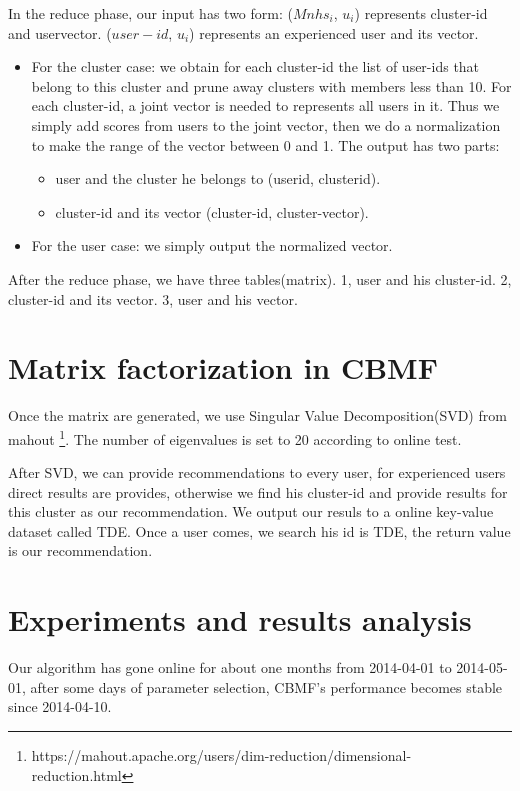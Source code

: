 In the reduce phase, our input has two form: ($Mnhs_i$, $u_i$) represents cluster-id and uservector. ($user-id$, $u_i$) represents an experienced user and its vector.
\begin{itemize}
\item For the cluster case: we obtain for each cluster-id the list of user-ids that belong to this cluster and prune away clusters with members less than 10. For each cluster-id, a joint vector is needed to represents all users in it. Thus we simply add scores from users to the joint vector, then we do a normalization to make the range of the vector between 0 and 1. The output has two parts: 
\begin{itemize}
\item user and the cluster he belongs to (userid, clusterid). 
\item cluster-id and its vector (cluster-id, cluster-vector).
\end{itemize}
\item For the user case: we simply output the normalized vector.

\end{itemize}

After the reduce phase, we have three tables(matrix). 1, user and his cluster-id. 2, cluster-id and its vector. 3, user and his vector.

\section{Matrix factorization in CBMF}

Once the matrix are generated, we use Singular Value Decomposition(SVD) from mahout \footnote{https://mahout.apache.org/users/dim-reduction/dimensional-reduction.html}. The number of eigenvalues is set to 20 according to online test.

After SVD, we can provide recommendations to every user, for experienced users direct results are provides, otherwise we find his cluster-id and provide results for this cluster as our recommendation. We output our resuls to a online key-value dataset called TDE. Once a user comes, we search his id is TDE, the return value is our recommendation.

\section{Experiments and results analysis}

Our algorithm has gone online for about one months from 2014-04-01 to 2014-05-01, after some days of parameter selection, CBMF's performance becomes stable since 2014-04-10.

